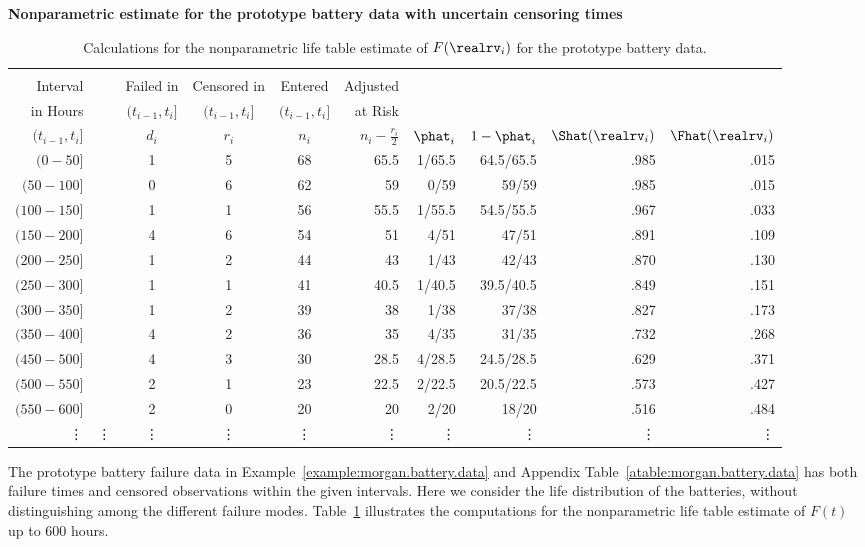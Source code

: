 \begin{example}
{\bf Nonparametric estimate for the prototype battery data with
uncertain censoring times}
\label{example:proto.battery.npmle}
\begin{table}
\caption{Calculations for the nonparametric life table estimate of $F(\realrv_{i})$
for the prototype battery data.}
\centering\small
\begin{tabular}{rrcccrrrrr}
\\[-.5ex]
\hline
\\[-1.5ex]
Interval&  & Failed in& Censored in&Entered& Adjusted& \\
in Hours &  &$(t_{i-1},t_{i}]$ &$(t_{i-1},t_{i}]$&$(t_{i-1},t_{i}]$ &
at Risk& \\
\cline{1-1}\cline{3-6}
$(t_{i-1},t_{i}]$ &  & $d_{i}$ & $r_{i}$ & $n_{i}$ & $n_{i}-\frac{r_{i}}{2}$ & $\phat_{i}$ & $1-\phat_{i}$
& $\Shat(\realrv_{i})$ & $\Fhat(\realrv_{i})$ \\[.8ex]
\hline
  $(0-50]$     & & 1 & 5 & 68 & 65.5 & 1/65.5 & 64.5/65.5 & .985 & .015 \\
  $(50-100]$   & & 0 & 6 & 62 & 59 & 0/59 & 59/59 & .985 & .015 \\ 
  $(100- 150]$ & & 1 & 1 & 56 & 55.5 & 1/55.5 & 54.5/55.5 & .967 & .033 \\ 
  $(150- 200]$ & & 4 & 6 & 54 & 51 & 4/51 & 47/51 & .891 & .109 \\
  $(200- 250]$ & & 1 & 2 & 44 & 43 & 1/43 & 42/43 & .870 & .130 \\
  $(250- 300]$ & & 1 & 1 & 41 & 40.5 & 1/40.5 & 39.5/40.5 & .849 & .151 \\
  $(300- 350]$ & & 1 & 2 & 39 & 38 & 1/38 & 37/38 & .827 & .173 \\
  $(350- 400]$ & & 4 & 2 & 36 & 35 & 4/35 & 31/35 & .732 & .268 \\ 
   $(450- 500]$& & 4 & 3 & 30 & 28.5 & 4/28.5 & 24.5/28.5 & .629 & .371 \\
  $(500- 550]$ & & 2 & 1 & 23 & 22.5 & 2/22.5 & 20.5/22.5 & .573 & .427 \\
 $ (550- 600]$ & & 2 & 0 & 20 & 20 & 2/20 & 18/20 & .516 & .484\\
\vdots &\vdots &\vdots &\vdots &\vdots &\vdots 
&\vdots &\vdots &\vdots &\vdots \\[1ex] \hline 
\end{tabular}
\label{table:battery.pl}
\end{table}
The prototype battery failure data in
Example~\ref{example:morgan.battery.data} and Appendix
Table~\ref{atable:morgan.battery.data} has both failure times and
censored observations within the given intervals.
Here we consider the life distribution
of the batteries, without distinguishing among the
different failure modes.
Table~\ref{table:battery.pl} illustrates the computations for the
nonparametric life table estimate of $F(t)$ up to 600 hours.
\end{example}

